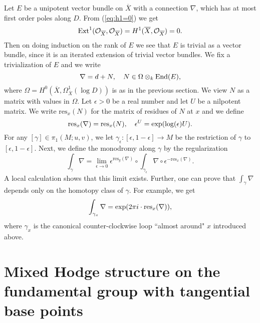Let $E$ be a unipotent vector bundle on $\overline{X}$ with a connection $\nabla$, which has at most first order poles along $D$.  From (\ref{eq:h1=0}) we get $$\textnormal{Ext}^1(\mathcal{O}_{\overline{X}},\mathcal{O}_{\overline{X}})=H^1(\overline{X},\mathcal{O}_{\overline{X}})=0.$$ Then on doing induction on the rank of $E$ we see that $E$ is trivial as a vector bundle, since it is an iterated extension of trivial vector bundles. We fix a trivialization of $E$ and we write $$\nabla=d+N, \ \ \ N\in \Omega\otimes_k \textnormal{End}(E),$$ 
where $\Omega=H^0(\overline{X},\Omega^1_{\overline{X}}(\log D))$ is as in the previous section. 
We view $N$ as a matrix with values in $\Omega$. %
Let $\epsilon>0$ be a real number and let $U$ be a nilpotent matrix. We write $\mathrm{res}_x(N)$ for the matrix of residues of $N$ at $x$ and we define 
$$\textnormal{res}_x(\nabla)= \textnormal{res}_x(N), \ \ \ \epsilon^U = \exp(\log(\epsilon)U).$$
For any $[\gamma] \in \pi_1(M; u,v)$, we let $\gamma_{\epsilon}:[\epsilon,1-\epsilon]\to M$ be the restriction of $\gamma$ to $[\epsilon,1-\epsilon]$. Next, we define the monodromy along $\gamma$ by the regularization
$$
\int_{\gamma} \nabla= \lim_{\epsilon \to 0} \epsilon^{\mathrm{res}_y(\nabla)} \circ \int_{\gamma_\epsilon}\nabla \circ \epsilon^{-\mathrm{res}_x(\nabla)}.
$$
A local calculation shows that this limit exists. Further, one can prove that $\int_{\gamma} \nabla$ depends only on the homotopy class of $\gamma$. 
For example, we get  $$\int_{\gamma_x} \nabla=\exp(2\pi i\cdot \textnormal{res}_x(\nabla)),$$
where $\gamma_x$ is the canonical counter-clockwise loop ``almost around" $x$ introduced above.

\section{Mixed Hodge structure on the fundamental group with tangential base points}\label{sec:hodgetangential}

